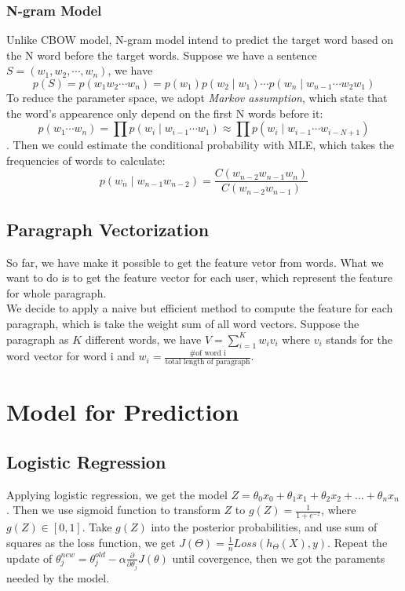 \documentclass{article}
\begin{document}
\subsubsection{N-gram Model}
Unlike CBOW model, N-gram model intend to predict the target word based on the N word before the target words. Suppose we have a sentence $S=\left( w_1,w_2,\cdots,w_n\right) $, we have $$p(S)=p\left(w_{1} w_{2} \cdots w_{n}\right)=p\left(w_{1}\right) p\left(w_{2} \mid w_{1}\right) \cdots p\left(w_{n} \mid w_{n-1} \cdots w_{2} w_{1}\right)$$ To reduce the parameter space, we adopt \emph{Markov assumption}, which state that the word's appearence only depend on the first N words before it: $$p\left(w_{1} \cdots w_{n}\right)=\prod p\left(w_{i} \mid w_{i-1} \cdots w_{1}\right) \approx \prod p\left(w_{i} \mid w_{i-1} \cdots w_{i-N+1}\right)$$. Then we could estimate the conditional probability with MLE, which takes the frequencies of words to calculate:$$p\left(w_{n} \mid w_{n-1} w_{n-2}\right)=\frac{C\left(w_{n-2} w_{n-1} w_{n}\right)}{C\left(w_{n-2} w_{n-1}\right)}$$

\subsection{Paragraph Vectorization}
So far, we have make it possible to get the feature vetor from words. What we want to do is to get the feature vector for each user, which represent the feature for whole paragraph.\\
We decide to apply a naive but efficient method to compute the feature for each paragraph, which is take the weight sum of all word vectors. Suppose the paragraph as $K$ different words, we have $V = \sum_{i=1}^{K}w_iv_i$ where $v_i$ stands for the word vector for word i and $w_i = \frac{\text{\# of word i}}{\text{total length of paragraph}}$.

\section{Model for Prediction}
\subsection{Logistic Regression}

Applying logistic regression, we get the model $Z = \theta_0 x_0 + \theta_1 x_1 +\theta_2 x_2 + ... +\theta_n x_n$. Then we use sigmoid function to transform $Z$ to $g\left( Z\right)  = \frac{1}{1+ e^{-z}}$, where $g(Z)  \in \left[0,1\right]$. Take $g(Z)$ into  the posterior probabilities, and use sum of squares as the loss function, we get $J\left( \Theta\right) = \frac{1}{n} Loss\left( h_\Theta\left( X\right), y \right) $. Repeat the update of $\theta_j^{new} = \theta_j^{old} - \alpha \frac{\partial}{\partial \theta_j}J\left( \theta\right) $ until covergence, then we got the paraments needed by the model.
\end{document}
